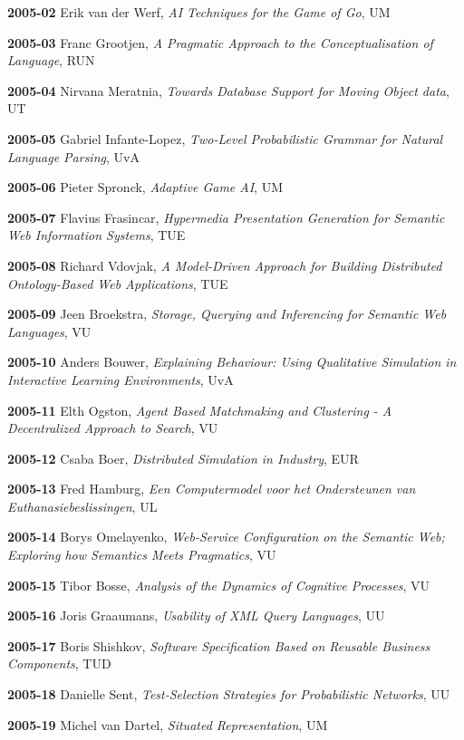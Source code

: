 \begin{multicols}{2}
\textbf{2005-02}   Erik van der Werf, \textit{AI Techniques for the Game of Go}, UM

\textbf{2005-03}   Franc Grootjen, \textit{A Pragmatic Approach to the Conceptualisation of Language}, RUN

\textbf{2005-04}   Nirvana Meratnia, \textit{Towards Database Support for Moving Object data}, UT

\textbf{2005-05}   Gabriel Infante-Lopez, \textit{Two-Level Probabilistic Grammar for Natural Language Parsing}, UvA

\textbf{2005-06}   Pieter Spronck, \textit{Adaptive Game AI}, UM

\textbf{2005-07}   Flavius Frasincar, \textit{Hypermedia Presentation Generation for Semantic Web Information Systems}, TUE

\textbf{2005-08}   Richard Vdovjak, \textit{A Model-Driven Approach for Building Distributed Ontology-Based Web Applications}, TUE

\textbf{2005-09}   Jeen Broekstra, \textit{Storage, Querying and Inferencing for Semantic Web Languages}, VU

\textbf{2005-10}   Anders Bouwer, \textit{Explaining Behaviour: Using Qualitative Simulation in Interactive Learning Environments}, UvA

\textbf{2005-11}   Elth Ogston, \textit{Agent Based Matchmaking and Clustering - A Decentralized Approach to Search}, VU

\textbf{2005-12}   Csaba Boer, \textit{Distributed Simulation in Industry}, EUR

\textbf{2005-13}   Fred Hamburg, \textit{Een Computermodel voor het Ondersteunen van Euthanasiebeslissingen}, UL

\textbf{2005-14}   Borys Omelayenko, \textit{Web-Service Configuration on the Semantic Web; Exploring how Semantics Meets Pragmatics}, VU

\textbf{2005-15}   Tibor Bosse, \textit{Analysis of the Dynamics of Cognitive Processes}, VU

\textbf{2005-16}   Joris Graaumans, \textit{Usability of XML Query Languages}, UU

\textbf{2005-17}   Boris Shishkov, \textit{Software Specification Based on Reusable Business Components}, TUD

\textbf{2005-18}   Danielle Sent, \textit{Test-Selection Strategies for Probabilistic Networks}, UU

\textbf{2005-19}   Michel van Dartel, \textit{Situated Representation}, UM


\end{multicols}
